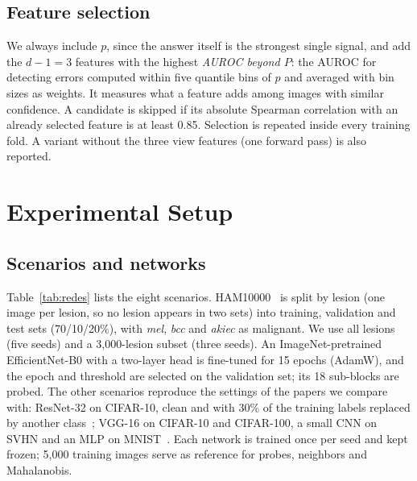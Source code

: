 \subsection{Feature selection}
We always include $p$, since the answer itself is the strongest single signal, and add the $d-1=3$ features with the highest
\emph{AUROC beyond $P$}: the AUROC for detecting errors computed within five quantile bins of $p$ and averaged with bin sizes as weights.
It measures what a feature adds among images with similar confidence. A candidate is skipped if its absolute Spearman correlation with
an already selected feature is at least 0.85. Selection is repeated inside every training fold. A variant without the three view features
(one forward pass) is also reported.

\section{Experimental Setup}

\subsection{Scenarios and networks}
Table~\ref{tab:redes} lists the eight scenarios. HAM10000~\cite{tschandl2018} is split by lesion (one image per lesion, so no lesion
appears in two sets) into training, validation and test sets (70/10/20\%), with \textit{mel}, \textit{bcc} and \textit{akiec} as malignant.
We use all lesions (five seeds) and a 3,000-lesion subset (three seeds). An ImageNet-pretrained EfficientNet-B0 with a two-layer head is
fine-tuned for 15 epochs (AdamW), and the epoch and threshold are selected on the validation set; its 18 sub-blocks are probed.
The other scenarios reproduce the settings of the papers we compare with: ResNet-32 on CIFAR-10, clean and with 30\% of the training
labels replaced by another class~\cite{chen2019}; VGG-16 on CIFAR-10 and CIFAR-100, a small CNN on SVHN and an MLP on MNIST~\cite{corbiere2019,jaeger2023}.
Each network is trained once per seed and kept frozen; 5,000 training images serve as reference for probes, neighbors and Mahalanobis.

